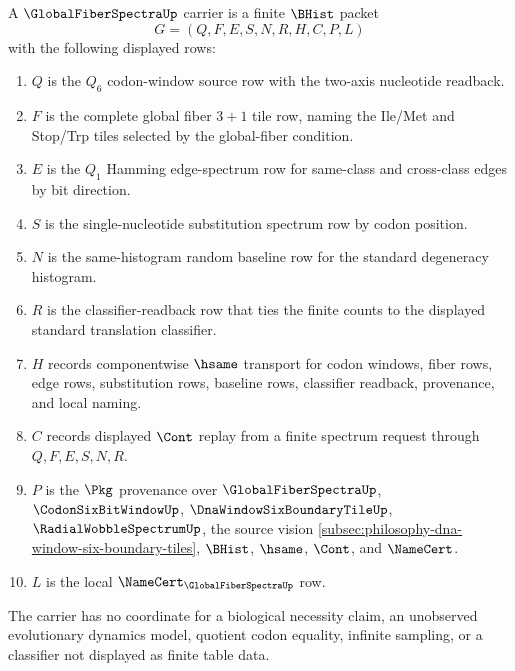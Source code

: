 \begin{definition}
\label{def:global-fiber-spectra-carrier}
A $\GlobalFiberSpectraUp$ carrier is a finite $\BHist$ packet
$$
G=(Q,F,E,S,N,R,H,C,P,L)
$$
with the following displayed rows:
\begin{enumerate}
\item $Q$ is the $Q_{6}$ codon-window source row with the two-axis nucleotide readback.
\item $F$ is the complete global fiber $3+1$ tile row, naming the Ile/Met and Stop/Trp tiles selected by the global-fiber condition.
\item $E$ is the $Q_{1}$ Hamming edge-spectrum row for same-class and cross-class edges by bit direction.
\item $S$ is the single-nucleotide substitution spectrum row by codon position.
\item $N$ is the same-histogram random baseline row for the standard degeneracy histogram.
\item $R$ is the classifier-readback row that ties the finite counts to the displayed standard translation classifier.
\item $H$ records componentwise $\hsame$ transport for codon windows, fiber rows, edge rows, substitution rows, baseline rows, classifier readback, provenance, and local naming.
\item $C$ records displayed $\Cont$ replay from a finite spectrum request through $Q,F,E,S,N,R$.
\item $P$ is the $\Pkg$ provenance over $\GlobalFiberSpectraUp$, $\CodonSixBitWindowUp$, $\DnaWindowSixBoundaryTileUp$, $\RadialWobbleSpectrumUp$, the source vision \autoref{subsec:philosophy-dna-window-six-boundary-tiles}, $\BHist$, $\hsame$, $\Cont$, and $\NameCert$.
\item $L$ is the local $\NameCert_{\GlobalFiberSpectraUp}$ row.
\end{enumerate}
The carrier has no coordinate for a biological necessity claim, an unobserved evolutionary dynamics model, quotient codon equality, infinite sampling, or a classifier not displayed as finite table data.
\end{definition}

